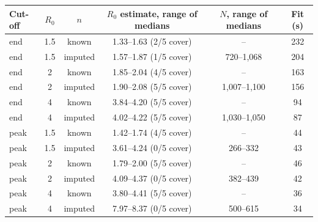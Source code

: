 \begin{tabular}{l c c c c c}
\toprule
Cut-off & $R_0$ & $n$ & $R_0$ estimate, range of medians & $N$, range of medians & Fit (s) \\
\midrule
end & 1.5 & known & 1.33--1.63 (2/5 cover) & -- & 232 \\
end & 1.5 & imputed & 1.57--1.87 (1/5 cover) & 720--1{,}068 & 204 \\
end & 2 & known & 1.85--2.04 (4/5 cover) & -- & 163 \\
end & 2 & imputed & 1.90--2.08 (5/5 cover) & 1{,}007--1{,}100 & 156 \\
end & 4 & known & 3.84--4.20 (5/5 cover) & -- & 94 \\
end & 4 & imputed & 4.02--4.22 (5/5 cover) & 1{,}030--1{,}050 & 87 \\
\midrule
peak & 1.5 & known & 1.42--1.74 (4/5 cover) & -- & 44 \\
peak & 1.5 & imputed & 3.61--4.24 (0/5 cover) & 266--332 & 43 \\
peak & 2 & known & 1.79--2.00 (5/5 cover) & -- & 46 \\
peak & 2 & imputed & 4.09--4.37 (0/5 cover) & 382--439 & 42 \\
peak & 4 & known & 3.80--4.41 (5/5 cover) & -- & 36 \\
peak & 4 & imputed & 7.97--8.37 (0/5 cover) & 500--615 & 34 \\
\bottomrule
\end{tabular}
